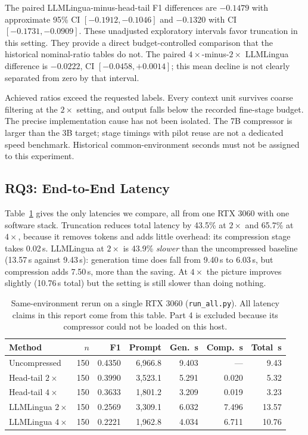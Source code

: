 \documentclass[10pt,a4paper,twocolumn]{article}
\begin{document}
The paired LLMLingua-minus-head-tail F1 differences are $-0.1479$ with approximate
95\% CI $[-0.1912,-0.1046]$ and $-0.1320$ with CI $[-0.1731,-0.0909]$.
These unadjusted exploratory intervals favor truncation in this setting. They
provide a direct budget-controlled comparison that the historical nominal-ratio
tables do not. The paired $4\times$-minus-$2\times$ LLMLingua difference is
$-0.0222$, CI $[-0.0458,+0.0014]$; this mean decline is not clearly separated
from zero by that interval.

Achieved ratios exceed the requested labels. Every context unit survives coarse
filtering at the $2\times$ setting, and output falls below the recorded fine-stage
budget. The precise implementation cause has not been isolated. The 7B
compressor is larger than the 3B target; stage timings with pilot reuse are not a
dedicated speed benchmark. Historical common-environment seconds must not be
assigned to this experiment.

\subsection{RQ3: End-to-End Latency}

Table~\ref{tab:rerun} gives the only latencies we compare, all from one RTX 3060
with one software stack. Truncation reduces total latency by 43.5\% at $2\times$
and 65.7\% at $4\times$, because it removes tokens and adds little overhead: its
compression stage takes 0.02\,s. LLMLingua at $2\times$ is 43.9\% \emph{slower}
than the uncompressed baseline (13.57\,s against 9.43\,s): generation time does fall
from 9.40\,s to 6.03\,s, but compression adds 7.50\,s, more than the saving. At
$4\times$ the picture improves slightly (10.76\,s total) but the setting is still
slower than doing nothing.

\begin{table}[t]
\centering
\footnotesize
\setlength{\tabcolsep}{3.2pt}
\begin{tabular}{@{}lrrrrrr@{}}
\toprule
Method & $n$ & F1 & Prompt & Gen.\ s & Comp.\ s & Total\ s \\
\midrule
Uncompressed        & 150 & 0.4350 & 6{,}966.8 & 9.403 & ---    & 9.43 \\
Head-tail $2\times$ & 150 & 0.3990 & 3{,}523.1 & 5.291 & 0.020  & 5.32 \\
Head-tail $4\times$ & 150 & 0.3633 & 1{,}801.2 & 3.209 & 0.019  & 3.23 \\
LLMLingua $2\times$ & 150 & 0.2569 & 3{,}309.1 & 6.032 & 7.496  & 13.57 \\
LLMLingua $4\times$ & 150 & 0.2221 & 1{,}962.8 & 4.034 & 6.711  & 10.76 \\
\bottomrule
\end{tabular}
\caption{Same-environment rerun on a single RTX 3060 (\texttt{run\_all.py}). All
latency claims in this report come from this table. Part 4 is excluded because its
compressor could not be loaded on this host.}
\label{tab:rerun}
\end{table}
\end{document}
